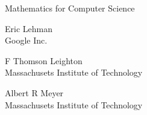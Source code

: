 \begin{center}
\begin{minipage}{4.5in}
\begin{center}
\rule{0in}{2in}
{\huge Mathematics for Computer Science}\\

\Stamp


\vspace{1in}
{\LARGE Eric Lehman}\\
{\large Google Inc.}

\vspace{0.3in}
{\LARGE F Thomson Leighton}\\
{\large Massachusets Institute of Technology}

\vspace{0.3in}
{\LARGE Albert R Meyer}\\
{\large Massachusets Institute of Technology}

\end{center}

\end{minipage}
\end{center}
\coursecopyright

\tableofcontents


\listoffigures

\endinput
